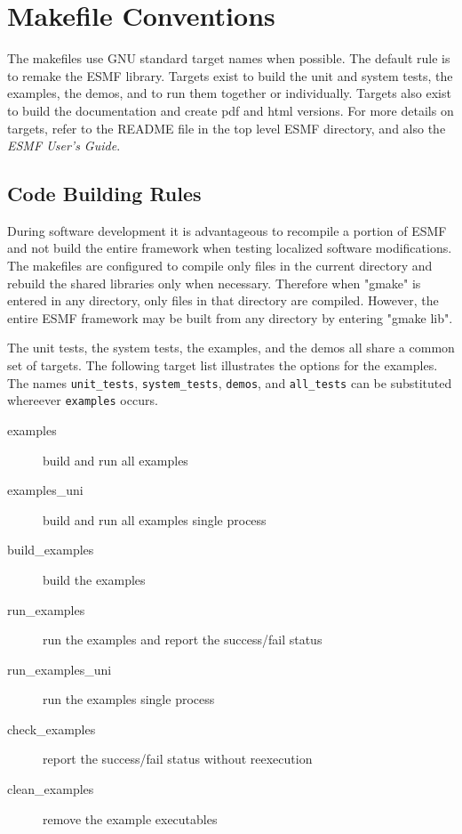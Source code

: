 
\section{Makefile Conventions} 	 

The makefiles use GNU standard target names when possible.
The default rule is to remake the ESMF library.  Targets exist
to build the unit and system tests, the examples, the demos,
and to run them together or individually.  Targets also exist
to build the documentation and create pdf and html versions.
For more details on targets, refer to the README file in the top
level ESMF directory, and also the {\it ESMF User's Guide}.


\subsection{Code Building Rules} 
During software development it is advantageous to recompile a portion of
ESMF and not build the entire framework when testing localized software
modifications.  The makefiles are configured to compile only files in the
current directory and rebuild the shared libraries only when necessary.
Therefore when "gmake" is entered in any directory, only files in that
directory are compiled.  However, the entire ESMF framework may be built
from any directory by entering "gmake lib".

The unit tests, the system tests, the examples, and the demos all share
a common set of targets.  The following target list illustrates the
options for the examples.  The names {\tt unit\_tests}, {\tt system\_tests},
{\tt demos}, and {\tt all\_tests} can be substituted whereever {\tt examples}
occurs.
\begin{description} 
\item [examples] build and run all examples
\item [examples\_uni] build and run all examples single process
\item [build\_examples] build the examples
\item [run\_examples] run the examples and report the success/fail status
\item [run\_examples\_uni] run the examples single process
\item [check\_examples] report the success/fail status without reexecution
\item [clean\_examples] remove the example executables
\end{description} 

